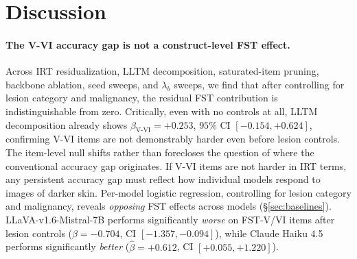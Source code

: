 \documentclass{article}
\begin{document}
\section{Discussion}
\label{sec:discussion}

\paragraph{The V-VI accuracy gap is not a construct-level FST effect.}
Across IRT residualization, LLTM decomposition, saturated-item pruning, backbone ablation, seed sweeps, and $\lambda_b$ sweeps, we find that after controlling for lesion category and malignancy, the residual FST contribution is indistinguishable from zero. Critically, even with no controls at all, LLTM decomposition already shows $\beta_{\text{V-VI}} = +0.253$, $95\%$ CI $[-0.154, +0.624]$, confirming V-VI items are not demonstrably harder even before lesion controls. The item-level null shifts rather than forecloses the question of where the conventional accuracy gap originates. If V-VI items are not harder in IRT terms, any persistent accuracy gap must reflect how individual models respond to images of darker skin. Per-model logistic regression, controlling for lesion category and malignancy, reveals \emph{opposing} FST effects across models (\S\ref{sec:baselines}). LLaVA-v1.6-Mistral-7B performs significantly \emph{worse} on FST-V/VI items after lesion controls ($\hat\beta = -0.704$, CI $[-1.357, -0.094]$), while Claude Haiku 4.5 performs significantly \emph{better} ($\hat\beta = +0.612$, CI $[+0.055, +1.220]$). 
\end{document}
